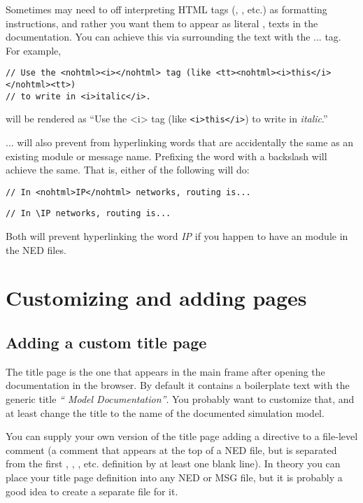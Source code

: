 Sometimes may need to off interpreting HTML tags (, , etc.)
as formatting instructions, and rather you want them to appear as literal
,  texts in the documentation. You can achieve this via
surrounding the text with the ... tag.
For example,

\begin{verbatim}
// Use the <nohtml><i></nohtml> tag (like <tt><nohtml><i>this</i></nohtml><tt>)
// to write in <i>italic</i>.
\end{verbatim}

will be rendered as ``Use the <i> tag (like \texttt{<i>this</i>}) to write
in \textit{italic}.''

... will also prevent 
from hyperlinking words that are accidentally the same as an existing
module or message name. Prefixing the word with a backslash will achieve
the same. That is, either of the following will do:

\begin{verbatim}
// In <nohtml>IP</nohtml> networks, routing is...
\end{verbatim}

\begin{verbatim}
// In \IP networks, routing is...
\end{verbatim}

Both will prevent hyperlinking the word \textit{IP} if you happen to have
an  module in the NED files.



\section{Customizing and adding pages}

\subsection{Adding a custom title page}

The title page is the one that appears in the main frame after
opening the documentation in the browser. By default it contains
a boilerplate text with the generic title \textit{``{\opp} Model Documentation''}.
You probably want to customize that, and at least change the title
to the name of the documented simulation model.

You can supply your own version of the title page adding a 
directive to a file-level comment (a comment that appears at the top of
a NED file, but is separated from the first , ,
, etc. definition by at least one blank line).
In theory you can place your title page definition into
any NED or MSG file, but it is probably a good idea to create
a separate  file for it.

